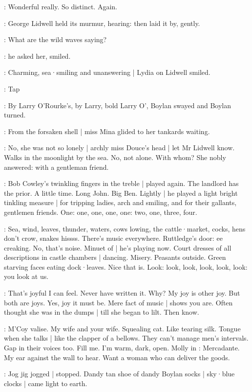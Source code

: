 \lidwell:
Wonderful really.
So distinct.
Again.

:
George Lidwell held its murmur,
hearing:
then laid it by,
gently.

\lidwell:
What are the wild waves saying?

:
he asked her,
smiled.

:
Charming,
sea·smiling and unanswering |
Lydia on Lidwell smiled.

\stripling:
Tap

:
By Larry O'Rourke's,
by Larry,
bold Larry O',
Boylan swayed
and Boylan turned.

:
From the forsaken shell |
miss Mina glided to her tankards waiting.

:
No,
she was not so lonely |
archly miss Douce's head |
let Mr Lidwell know.
Walks in the moonlight by the sea.
No,
not alone.
With whom?
She nobly answered:
with a gentleman friend.

:
Bob Cowley's twinkling fingers in the treble |
played again.
The landlord has the prior.
A little time.
Long John.
Big Ben.
Lightly |
he played a light bright tinkling measure |
for tripping ladies,
arch and smiling,
and for their gallants,
gentlemen friends.
One:
one,
one,
one,
one:
two,
one,
three,
four.

\BloomIntB:
Sea,
wind,
leaves,
thunder,
waters,
cows lowing,
the cattle·market,
cocks,
hens don't crow,
snakes hissss.
There's music everywhere.
Ruttledge's door:
ee creaking.
No,
that's noise.
Minuet of  |
he's playing now.
Court dresses of all descriptions in castle chambers |
dancing.
Misery.
Peasants outside.
Green starving faces eating dock·leaves.
Nice that is.
Look:
look,
look,
look,
look,
look:
you look at us.

\BloomIntB:
That's joyful I can feel.
Never have written it.
Why?
My joy is other joy.
But both are joys.
Yes,
joy it must be.
Mere fact of music |
shows you are.
Often thought she was in the dumps |
till she began to lilt.
Then know.

\BloomIntB:
M'Coy valise.
My wife and your wife.
Squealing cat.
Like tearing silk.
Tongue when she talks |
like the clapper of a bellows.
They can't manage men's intervals.
Gap in their voices too.
Fill me.
I'm warm,
dark,
open.
Molly in :
Mercadante.
My ear against the wall to hear.
Want a woman who can deliver the goods.

:
Jog jig jogged |
stopped.
Dandy tan shoe of dandy Boylan socks |
sky·blue clocks |
came light to earth.

